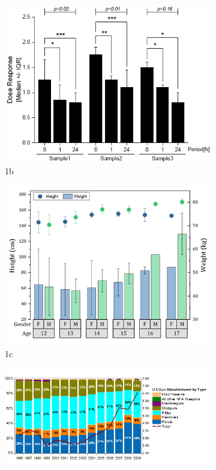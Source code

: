 \documentclass{article}
\begin{document}
\begin{figure}
  \begin{subfigure}{0.3\textwidth}
    \centering
    \includegraphics[width=1.0\linewidth]{fig/fig1.png}
    \caption{1b}
    \label{fig:comb_1b}
  \end{subfigure}
  \begin{subfigure}{0.3\textwidth}
    \centering
    \includegraphics[width=1.0\linewidth]{fig/fig2.png}
    \caption{1c}
    \label{fig:comb_1c}
  \end{subfigure}
  \begin{subfigure}{0.5\textwidth} %
    \centering
    \includegraphics[width=1.0\linewidth]{fig/fig3.png}

\end{subfigure}
\end{figure}
\end{document}
